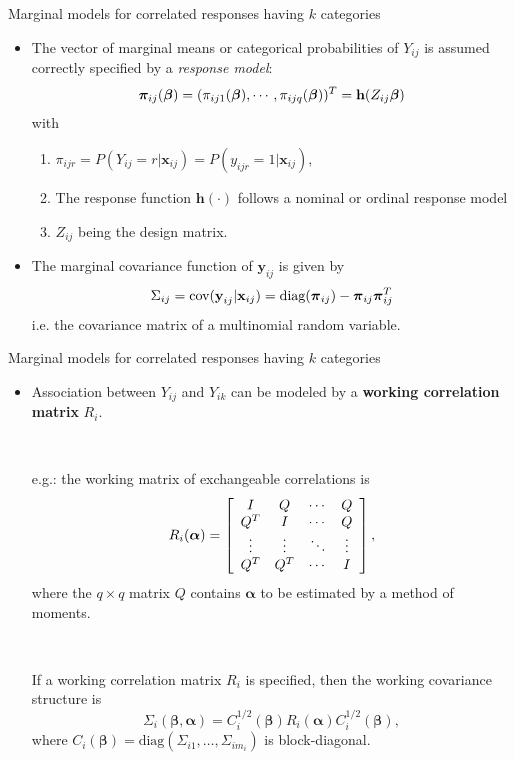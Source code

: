 \documentclass{beamer}
\newcommand{\boldbeta}{{\boldsymbol \beta}}
\newcommand{\boldalpha}{{\boldsymbol \alpha}}
\newenvironment{wideitemize}%
  {\begin{itemize}%
    \setlength{\parskip}{1em}}%
  {\end{itemize}}
\begin{document}
\begin{frame}{\large Marginal models for correlated responses having $k$ categories }
\begin{wideitemize}
\item[(i)]
The vector of marginal means or categorical probabilities of $Y_{ij}$ is assumed  correctly
specified by a \textit{response model}:
\[
{\boldsymbol \pi}_{ij}(\mbox{\boldmath $\beta$})=(\pi_{ij1}(\mbox{\boldmath $\beta$}),
\cdots, \pi_{ijq}(\mbox{\boldmath $\beta$}))^T=\textbf{h}(Z_{ij}\mbox{\boldmath $\beta$})
\]
with 
\begin{enumerate}
\item 
$\pi_{ijr}=P(Y_{ij}=r|\textbf{x}_{ij})=P(y_{ijr}=1|\textbf{x}_{ij})$,
\item  The response function
$\textbf{h}(\cdot)$ follows a nominal or ordinal response model
\item $Z_{ij}$ being the design matrix. 
\end{enumerate}
\item[(ii)]
The marginal covariance function of $\textbf{y}_{ij}$ is given by
$$\Sigma_{ij}=\mbox{cov}(\textbf{y}_{ij}|\textbf{x}_{ij})=\mbox{diag}(\mbox{\boldmath $\pi$}_{ij})
-\mbox{\boldmath $\pi$}_{ij}\mbox{\boldmath $\pi$}_{ij}^T$$
i.e. the covariance matrix of a multinomial random variable.
\end{wideitemize}
\end{frame}

\begin{frame}{\large Marginal models for correlated responses having $k$ categories }
\begin{itemize}
\item[(iii)]
Association between $Y_{ij}$ and $Y_{ik}$ can be  modeled by a {\bf working correlation matrix} $R_i$.

\ \

e.g.: the working matrix of exchangeable correlations is \vspace*{-8pt}
{\scriptsize
$$R_i(\mbox{\boldmath $\alpha$})=\left[\begin{array}{cccc} I & Q & \cdots & Q\\ Q^T & I & \cdots
& Q \\ \vdots & \vdots & \ddots & \vdots \\ Q^T & Q^T & \cdots & I\end{array}\right]\vspace*{-2pt},$$} 
where the $q\times q$ matrix $Q$ contains $\boldalpha$ to be estimated by 
a method of moments.

\ \

 If a working correlation matrix $R_i$ is specified, then the working covariance structure is 
\[
\Sigma_i (\boldbeta, \boldalpha) = C_i^{1/2} (\boldbeta) R_i (\boldalpha)C_i^{1/2} (\boldbeta),
\]
where $C_i (\boldbeta) = \text{diag} (\Sigma_{i1}, \dots, \Sigma_{i m_i})$ is block-diagonal.

\end{itemize}


\end{frame}
\end{document}
